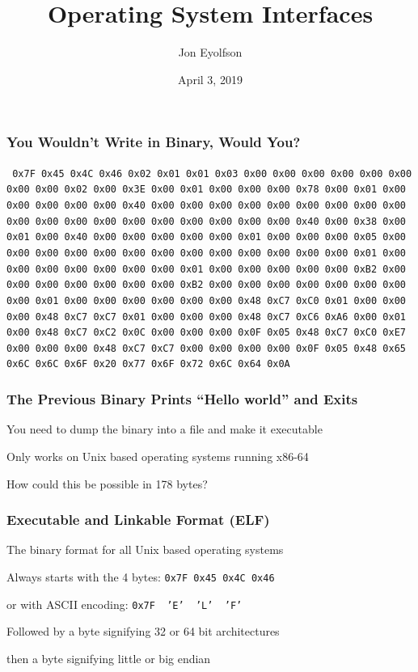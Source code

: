 \documentclass[aspectratio=169]{beamer}
\title{Operating System Interfaces}
\date{April 3, 2019}
\author{Jon Eyolfson}
\begin{document}
  \begin{frame}[plain]
    \titlepage
  \end{frame}

  \setcounter{framenumber}{0}

  \begin{frame}
    \frametitle{You Wouldn't Write in Binary, Would You?}

    \texttt{%
      0x7F 0x45 0x4C 0x46 0x02 0x01 0x01 0x03 0x00 0x00 0x00 0x00 0x00 0x00 0x00
      0x00 0x02 0x00 0x3E 0x00 0x01 0x00 0x00 0x00 0x78 0x00 0x01 0x00 0x00 0x00
      0x00 0x00 0x40 0x00 0x00 0x00 0x00 0x00 0x00 0x00 0x00 0x00 0x00 0x00 0x00
      0x00 0x00 0x00 0x00 0x00 0x00 0x00 0x40 0x00 0x38 0x00 0x01 0x00 0x40 0x00
      0x00 0x00 0x00 0x00 0x01 0x00 0x00 0x00 0x05 0x00 0x00 0x00 0x00 0x00 0x00
      0x00 0x00 0x00 0x00 0x00 0x00 0x00 0x01 0x00 0x00 0x00 0x00 0x00 0x00 0x00
      0x01 0x00 0x00 0x00 0x00 0x00 0xB2 0x00 0x00 0x00 0x00 0x00 0x00 0x00 0xB2
      0x00 0x00 0x00 0x00 0x00 0x00 0x00 0x00 0x01 0x00 0x00 0x00 0x00 0x00 0x00
      0x48 0xC7 0xC0 0x01 0x00 0x00 0x00 0x48 0xC7 0xC7 0x01 0x00 0x00 0x00 0x48
      0xC7 0xC6 0xA6 0x00 0x01 0x00 0x48 0xC7 0xC2 0x0C 0x00 0x00 0x00 0x0F 0x05
      0x48 0xC7 0xC0 0xE7 0x00 0x00 0x00 0x48 0xC7 0xC7 0x00 0x00 0x00 0x00 0x0F
      0x05 0x48 0x65 0x6C 0x6C 0x6F 0x20 0x77 0x6F 0x72 0x6C 0x64 0x0A
    }
  \end{frame}

  \begin{frame}
    \frametitle{The Previous Binary Prints ``Hello world'' and Exits}

    You need to dump the binary into a file and make it executable

    \hspace{1em} Only works on Unix based operating systems running x86-64

    \vspace{2em}

    How could this be possible in 178 bytes?
  \end{frame}

  \begin{frame}
    \frametitle{Executable and Linkable Format (ELF)}

    The binary format for all Unix based operating systems

    \vspace{2em}

    Always starts with the 4 bytes: \hspace{0.5em} \texttt{0x7F 0x45 0x4C 0x46}

    \hspace{3em} or with ASCII encoding: \hspace{0.5em}
    \texttt{0x7F~~'E'~~'L'~~'F'}

    \vspace{2em}

    Followed by a byte signifying 32 or 64 bit architectures

    \hspace{1em} then a byte signifying little or big endian
  \end{frame}
\end{document}
